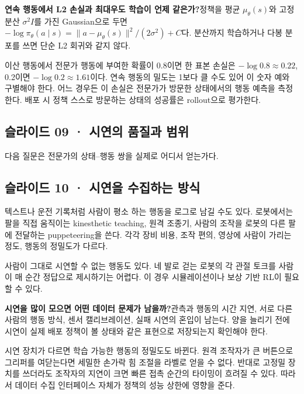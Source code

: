 \documentclass[11pt,a4paper]{article}
\begin{document}
\par\medskip\noindent\textbf{연속 행동에서 L2 손실과 최대우도 학습이 언제 같은가?}\quad 정책을 평균 $\mu_\theta(s)$와 고정 분산 $\sigma^2 I$를 가진 Gaussian으로 두면 $-\log\pi_\theta(a\mid s)=\|a-\mu_\theta(s)\|^2/(2\sigma^2)+C$다. 분산까지 학습하거나 다봉 분포를 쓰면 단순 L2 회귀와 같지 않다.\par

이산 행동에서 전문가 행동에 부여한 확률이 0.8이면 한 표본 손실은 $-\log0.8\approx0.22$, 0.2이면 $-\log0.2\approx1.61$이다. 연속 행동의 밀도는 1보다 클 수도 있어 이 숫자 예와 구별해야 한다. 어느 경우든 이 손실은 전문가가 방문한 상태에서의 행동 예측을 측정한다. 배포 시 정책 스스로 방문하는 상태의 성공률은 rollout으로 평가한다.\par

\subsection{슬라이드 09 · 시연의 품질과 범위}

다음 질문은 전문가의 상태–행동 쌍을 실제로 어디서 얻는가다.\par

\subsection{슬라이드 10 · 시연을 수집하는 방식}

텍스트나 운전 기록처럼 사람이 평소 하는 행동을 로그로 남길 수도 있다. 로봇에서는 팔을 직접 움직이는 kinesthetic teaching, 원격 조종기, 사람의 조작을 로봇의 다른 팔에 전달하는 puppeteering을 쓴다. 각각 장비 비용, 조작 편의, 영상에 사람이 가리는 정도, 행동의 정밀도가 다르다.\par

사람이 그대로 시연할 수 없는 행동도 있다. 네 발로 걷는 로봇의 각 관절 토크를 사람이 매 순간 정답으로 제시하기는 어렵다. 이 경우 시뮬레이션이나 보상 기반 RL이 필요할 수 있다.\par

\par\medskip\noindent\textbf{시연을 많이 모으면 어떤 데이터 문제가 남을까?}\quad 관측과 행동의 시간 지연, 서로 다른 사람의 행동 방식, 센서 캘리브레이션, 실패 시연의 혼입이 남는다. 양을 늘리기 전에 시연이 실제 배포 정책이 볼 상태와 같은 표현으로 저장되는지 확인해야 한다.\par

시연 장치가 다르면 학습 가능한 행동의 정밀도도 바뀐다. 원격 조작자가 큰 버튼으로 그리퍼를 여닫는다면 세밀한 손가락 힘 조절을 라벨로 얻을 수 없다. 반대로 고정밀 장치를 쓰더라도 조작자의 지연이 크면 빠른 접촉 순간의 타이밍이 흐려질 수 있다. 따라서 데이터 수집 인터페이스 자체가 정책의 성능 상한에 영향을 준다.\par
\end{document}
